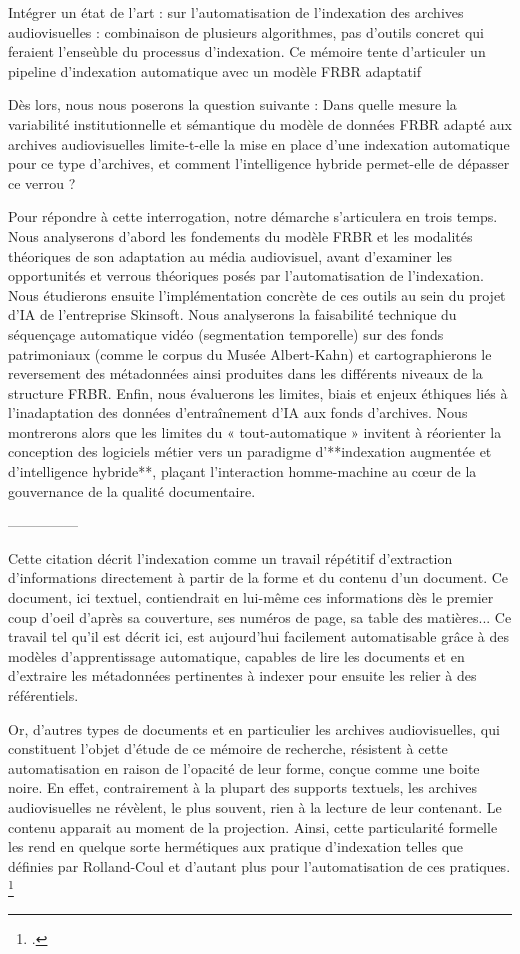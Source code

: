 Intégrer un état de l'art : sur l'automatisation de l'indexation des archives audiovisuelles : combinaison de plusieurs algorithmes, pas d'outils concret qui feraient l'enseùble du processus d'indexation. Ce mémoire tente d'articuler un pipeline d'indexation automatique avec un modèle FRBR adaptatif  

Dès lors, nous nous poserons la question suivante : Dans quelle mesure la variabilité institutionnelle et sémantique du modèle de données FRBR adapté aux archives audiovisuelles limite-t-elle la mise en place d'une indexation automatique pour ce type d'archives, et comment l'intelligence hybride permet-elle de dépasser ce verrou ?

Pour répondre à cette interrogation, notre démarche s'articulera en trois temps. 
Nous analyserons d'abord les fondements du modèle FRBR et les modalités théoriques de son adaptation au média audiovisuel, avant d'examiner les opportunités et verrous théoriques posés par l'automatisation de l'indexation.
Nous étudierons ensuite l'implémentation concrète de ces outils au sein du projet d'IA de l'entreprise Skinsoft. Nous analyserons la faisabilité technique du séquençage automatique vidéo (segmentation temporelle) sur des fonds patrimoniaux (comme le corpus du Musée Albert-Kahn) et cartographierons le reversement des métadonnées ainsi produites dans les différents niveaux de la structure FRBR.
Enfin, nous évaluerons les limites, biais et enjeux éthiques liés à l'inadaptation des données d'entraînement d'IA aux fonds d'archives. Nous montrerons alors que les limites du « tout-automatique » invitent à réorienter la conception des logiciels métier vers un paradigme d'**indexation augmentée et d'intelligence hybride**, plaçant l'interaction homme-machine au cœur de la gouvernance de la qualité documentaire.


---------------

	
Cette citation décrit l'indexation comme un travail répétitif d'extraction d'informations directement à partir de la forme et du contenu d'un document. Ce document, ici textuel, contiendrait en lui-même ces informations dès le premier coup d'oeil d'après sa couverture, ses numéros de page, sa table des matières... Ce travail tel qu'il est décrit ici, est aujourd'hui facilement automatisable grâce à des modèles d'apprentissage automatique, capables de lire les documents et en d'extraire les métadonnées pertinentes à indexer pour ensuite les relier à des référentiels. 
	
Or, d'autres types de documents et en particulier les archives audiovisuelles, qui constituent l'objet d'étude de ce mémoire de recherche, résistent à cette automatisation en raison de l'opacité de leur forme, conçue comme une boite noire. En effet, contrairement à la plupart des supports textuels, les archives audiovisuelles ne révèlent, le plus souvent, rien à la lecture de leur contenant. Le contenu apparait au moment de la projection. Ainsi, cette particularité formelle les rend en quelque sorte hermétiques aux pratique d'indexation telles que définies par Rolland-Coul et d'autant plus pour l'automatisation de ces pratiques. \footcite{zotero-item-582}
	
